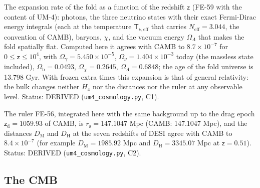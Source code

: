 \documentclass[
  10pt,
]{article}
\begin{document}
The expansion rate of the fold as a function of the redshift
\(\mathsf{z}\) (FE-59 with the content of UM-4): photons, the three
neutrino states with their exact Fermi-Dirac energy integrals (each at
the temperature \(\mathsf{T}_{\nu,\mathrm{eff}}\) that carries
\(N_{\mathrm{eff}} = 3.044\), the convention of CAMB), baryons,
\(\chi\), and the vacuum energy \(\Omega_\Lambda\) that makes the fold
spatially flat. Computed here it agrees with CAMB to
\(8.7\times10^{-7}\) for \(0 \le \mathsf{z} \le 10^4\), with
\(\Omega_\gamma = 5.450\times10^{-5}\),
\(\Omega_\nu = 1.404\times10^{-3}\) today (the massless state included),
\(\Omega_{\mathrm{b}} = 0.0493\), \(\Omega_\chi = 0.2645\),
\(\Omega_\Lambda = 0.6848\); the age of the fold universe is 13.798 Gyr.
With frozen extra times this expansion is that of general relativity:
the bulk changes neither \(H_4\) nor the distances nor the ruler at any
observable level. Status: DERIVED (\texttt{um4\_cosmology.py}, C1).

The ruler FE-56, integrated here with the same background up to the drag
epoch \(\mathsf{z}_{\mathrm{d}} = 1059.93\) of CAMB, is
\(r_{\mathrm{s}} = 147.1047\) Mpc (CAMB: 147.1047 Mpc), and the
distances \(D_{\mathrm{M}}\) and \(D_{\mathrm{H}}\) at the seven
redshifts of DESI agree with CAMB to \(8.4\times10^{-7}\) (for example
\(D_{\mathrm{M}} = 1985.92\) Mpc and \(D_{\mathrm{H}} = 3345.07\) Mpc at
\(\mathsf{z} = 0.51\)). Status: DERIVED (\texttt{um4\_cosmology.py},
C2).

\hypertarget{the-cmb}{%
\subsection{The CMB}\label{the-cmb}}
\end{document}
